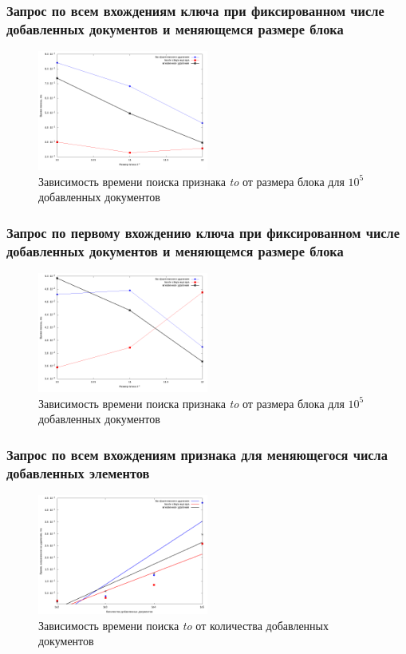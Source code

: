 \documentclass[aspectratio=169, pdf, 8pt, unicode]{beamer}
\begin{document}
\begin{frame}[fragile]
\frametitle{Запрос по всем вхождениям ключа при фиксированном числе добавленных
документов и меняющемся размере блока}
\begin{figure}[H]
\centering
\includegraphics[width=0.5\textwidth]{fig/limit_1e6/1e5/to.png}
\caption{Зависимость времени поиска признака \textit{to} от размера блока для $10^5$ добавленных документов}
\end{figure}
\end{frame}

\begin{frame}[fragile]
\frametitle{Запрос по первому вхождению ключа при фиксированном числе
добавленных документов и меняющемся размере блока}
\begin{figure}[H]
\centering
\includegraphics[width=0.5\textwidth]{fig/limit_1/1e5/to.png}
\caption{Зависимость времени поиска признака \textit{to} от размера блока для $10^5$ добавленных документов}
\end{figure}
\end{frame}

\begin{frame}[fragile]
\frametitle{Запрос по всем вхождениям признака для меняющегося числа
добавленных элементов}
\begin{figure}[H]
\centering
\includegraphics[width=0.5\textwidth]{fig/to.png}
\caption{Зависимость времени поиска \textit{to} от количества добавленных документов}
\end{figure}
\end{frame}
\end{document}

